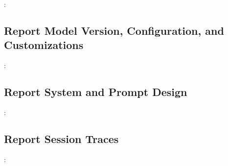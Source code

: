 \vspace{0.5\baselineskip}
\begin{framed}
\summary: %
\end{framed}



\subsection{Report Model Version, Configuration, and Customizations}
\label{sec:report-model-version-configuration-and-customizations}

\vspace{0.5\baselineskip}
\begin{framed}
\summary: %
\end{framed}



\subsection{Report System and Prompt Design}
\label{sec:report-system-and-prompt-design}

\vspace{0.5\baselineskip}
\begin{framed}
\summary: %
\end{framed}



\subsection{Report Session Traces}
\label{sec:report-session-traces}

\vspace{0.5\baselineskip}
\begin{framed}
\summary: %
\end{framed}

